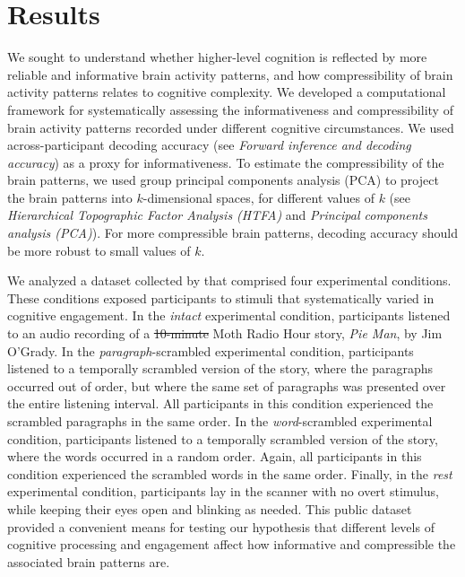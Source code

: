 \documentclass[english, 11pt]{article}
\providecommand{\DIFaddtex}[1]{{\protect\color{blue}\uwave{#1}}} %
\providecommand{\DIFdeltex}[1]{{\protect\color{red}\sout{#1}}}                      %
\providecommand{\DIFaddbegin}{} %
\providecommand{\DIFaddend}{} %
\providecommand{\DIFdelbegin}{} %
\providecommand{\DIFdelend}{} %
\providecommand{\DIFadd}[1]{\texorpdfstring{\DIFaddtex{#1}}{#1}} %
\providecommand{\DIFdel}[1]{\texorpdfstring{\DIFdeltex{#1}}{}} %
\newcommand{\DIFscaledelfig}{0.5}
\newlength{\DIFdelgraphicswidth} %
\newlength{\DIFdelgraphicsheight} %
\newcommand{\DIFaddincludegraphics}[2][]{{\color{blue}\fbox{\DIFOincludegraphics[#1]{#2}}}} %
\newcommand{\DIFdelincludegraphics}[2][]{%
\sbox{\DIFdelgraphicsbox}{\DIFOincludegraphics[#1]{#2}}%
\settoboxwidth{\DIFdelgraphicswidth}{\DIFdelgraphicsbox} %
\settoboxtotalheight{\DIFdelgraphicsheight}{\DIFdelgraphicsbox} %
\scalebox{\DIFscaledelfig}{%
\parbox[b]{\DIFdelgraphicswidth}{\usebox{\DIFdelgraphicsbox}\\[-\baselineskip] \rule{\DIFdelgraphicswidth}{0em}}\llap{\resizebox{\DIFdelgraphicswidth}{\DIFdelgraphicsheight}{%
\setlength{\unitlength}{\DIFdelgraphicswidth}%
\begin{picture}(1,1)%
\thicklines\linethickness{2pt} %
{\color[rgb]{1,0,0}\put(0,0){\framebox(1,1){}}}%
{\color[rgb]{1,0,0}\put(0,0){\line( 1,1){1}}}%
{\color[rgb]{1,0,0}\put(0,1){\line(1,-1){1}}}%
\end{picture}%
}\hspace*{3pt}}} %
} %
\DeclareRobustCommand{\DIFaddbegin}{\DIFOaddbegin \let\includegraphics\DIFaddincludegraphics} %
\DeclareRobustCommand{\DIFaddend}{\DIFOaddend \let\includegraphics\DIFOincludegraphics} %
\DeclareRobustCommand{\DIFdelbegin}{\DIFOdelbegin \let\includegraphics\DIFdelincludegraphics} %
\DeclareRobustCommand{\DIFdelend}{\DIFOaddend \let\includegraphics\DIFOincludegraphics} %
\begin{document}
\section*{Results}

We sought to understand whether higher-level cognition is reflected by more
reliable and informative brain activity patterns, and how compressibility of
brain activity patterns relates to cognitive complexity. We developed a
computational framework for systematically assessing the informativeness and
compressibility of brain activity patterns recorded under different cognitive
circumstances. We used across-participant decoding accuracy (see
\textit{Forward inference and decoding accuracy}) as a proxy for
informativeness. To estimate the compressibility of the brain patterns, we used
group principal components analysis (PCA) to project the brain patterns into
$k$-dimensional spaces, for different values of $k$ (see \textit{Hierarchical
Topographic Factor Analysis (HTFA)} and \textit{Principal components analysis
(PCA)}). For more compressible brain patterns, decoding accuracy should be more
robust to small values of $k$.

We analyzed a dataset collected by \cite{SimoEtal16} that comprised four
experimental conditions. These conditions exposed participants to stimuli that
systematically varied in cognitive engagement. In the \textit{intact}
experimental condition, participants listened to an audio recording of a
\DIFdelbegin \DIFdel{10-minute }\DIFdelend \DIFaddbegin \DIFadd{7-minute }\DIFaddend Moth Radio Hour story, \textit{Pie Man}, by Jim O'Grady. In the
\textit{paragraph}-scrambled experimental condition, participants listened to a
temporally scrambled version of the story, where the paragraphs occurred out of
order, but where the same set of paragraphs was presented over the entire
listening interval. All participants in this condition experienced the
scrambled paragraphs in the same order. In the \textit{word}-scrambled
experimental condition, participants listened to a temporally scrambled version
of the story, where the words occurred in a random order. Again, all
participants in this condition experienced the scrambled words in the same
order. Finally, in the \textit{rest} experimental condition, participants lay
in the scanner with no overt stimulus, while keeping their eyes open and
blinking as needed. This public dataset provided a convenient means for testing
our hypothesis that different levels of cognitive processing and engagement
affect how informative and compressible the associated brain patterns are.
\end{document}
